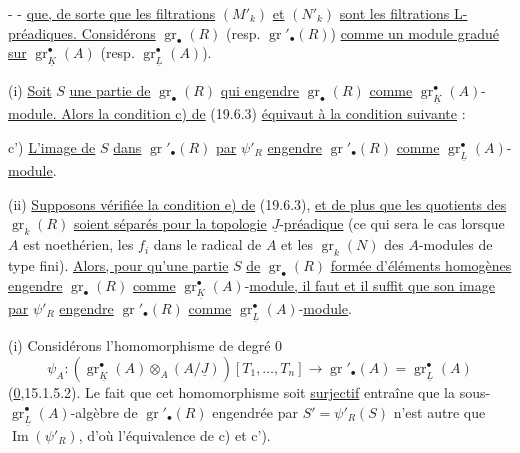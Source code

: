 -  -
\uline{que, de sorte que les filtrations} $(M'_k)$ \uline{et} $(N'_k)$ \uline{sont les filtrations
L-préadiques. Considérons} $\operatorname{gr}_\bullet(R)$ (resp. $\operatorname{gr}'_\bullet(R)$)
\uline{comme un module gradué sur} $\operatorname{gr}_{\underline K}^\bullet(A)$
(resp. $\operatorname{gr}_{\underline L}^\bullet(A)$).

(i) \uline{Soit} $S$ \uline{une partie de} $\operatorname{gr}_\bullet(R)$
\uline{qui engendre} $\operatorname{gr}_\bullet(R)$ \uline{comme}
$\operatorname{gr}_{\underline K}^\bullet(A)$-\uline{module. Alors la condition c) de}
(19.6.3) \uline{équivaut à la condition suivante} :

c') \uline{L'image de} $S$ \uline{dans} 
$\operatorname{gr}'_\bullet(R)$ \uline{par} $\psi'_R$ \uline{engendre}
$\operatorname{gr}'_\bullet(R)$ \uline{comme} $\operatorname{gr}_{\underline L}^\bullet(A)$-\uline{module}.

(ii) \uline{Supposons vérifiée la condition e) de} (19.6.3), \uline{et de plus que
les quotients des} $\operatorname{gr}_k(R)$ \uline{soient séparés pour la topologie}
$\underline J$-\uline{préadique} (ce qui sera le cas lorsque $A$ est noethérien,
les $f_i$ dans le radical de $A$ et les $\operatorname{gr}_k(N)$ des $A$-modules de type fini).
\uline{Alors, pour
qu'une partie} $S$ \uline{de} $\operatorname{gr}_\bullet(R)$
\uline{formée d'éléments homogènes engendre} $\operatorname{gr}_\bullet(R)$
\uline{comme} $\operatorname{gr}_{\underline K}^\bullet(A)$-\uline{module,
il faut et il suffit que son image par} $\psi'_R$ \uline{engendre}
$\operatorname{gr}'_\bullet(R)$ \uline{comme}
$\operatorname{gr}_{\underline L}^\bullet(A)$-\uline{module}.

(i) Considérons l'homomorphisme  de degré 0
\[
\psi_A:(\operatorname{gr}_{\underline K}^\bullet(A)\otimes_A(A/\underline J))[T_1,\ldots,T_n]
 \longrightarrow\operatorname{gr}'_\bullet(A)=\operatorname{gr}_{\underline L}^\bullet(A)
\]
(\uline{0},15.1.5.2). Le fait que cet homomorphisme soit \uline{surjectif} entraîne
que la sous-$\operatorname{gr}_{\underline L}^\bullet(A)$-algèbre de
$\operatorname{gr}'_\bullet(R)$ engendrée par $S'=\psi'_R(S)$ n'est
autre que 
$\operatorname{Im}(\psi'_R)$, d'où l'équivalence de c) et c').

